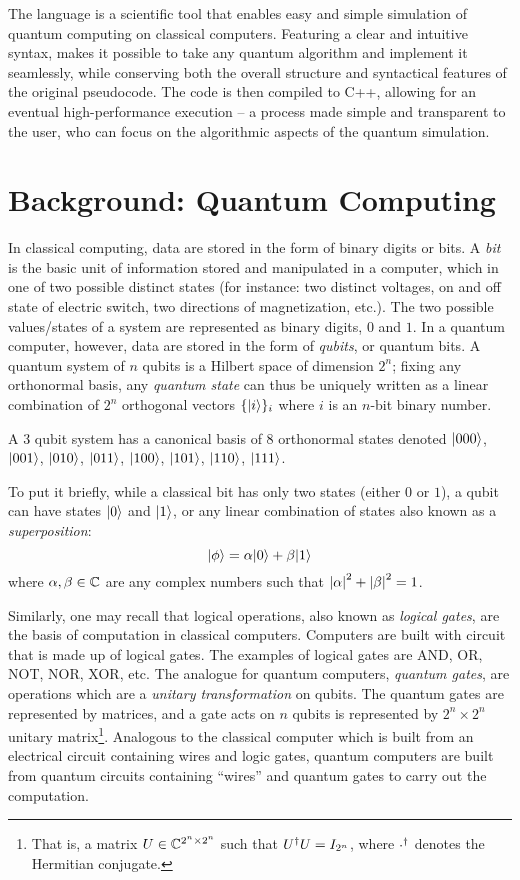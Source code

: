 The \QL language is a scientific tool that enables easy and simple simulation of quantum computing on classical computers. 
Featuring a clear and intuitive syntax, \QL makes it possible to take any quantum algorithm and implement it seamlessly, while 
conserving both the overall structure and syntactical features of the original pseudocode. The \QL code is then compiled to 
C++, allowing for an eventual high-performance execution -- a process made simple and transparent to the user, who can focus on
the algorithmic aspects of the quantum simulation.
\section{Background: Quantum Computing}

In classical computing, data are stored in the form of binary digits or bits. A \emph{bit} is the basic unit of information stored and manipulated in a computer, which in one of two possible distinct states (for instance: two distinct voltages, on and off state of electric switch, two directions of magnetization, etc.). 
The two possible values/states of a system are represented as binary digits, $0$ and $1$. In a quantum computer, however, data are stored in the form of \emph{qubits}, or quantum bits. A quantum system of $n$ qubits is a Hilbert space of dimension $2^n$; fixing any orthonormal basis, any \emph{quantum state} can thus be uniquely written as a linear combination of $2^n$ orthogonal vectors $\{|i\rangle\}_i$ where $i$ is an $n$-bit binary number.

\begin{example}A $3$ qubit system has a canonical basis of 8 orthonormal states denoted 
$|000\rangle$, $|001\rangle$, $|010\rangle$, $|011\rangle$, $|100\rangle$, $|101\rangle$, $|110\rangle$, $|111\rangle$.
\end{example}
To put it briefly, while a classical bit has only two states (either $0$ or $1$), a qubit can have  states $|0\rangle$ and $|1\rangle$, or any linear combination of states also known as a \emph{superposition}: %
\[
	|\phi\rangle=\alpha|0\rangle+\beta|1\rangle
\]
where $\alpha,\beta\in\mathbb{C}$ are any complex numbers such that $\left\lvert \alpha \right\rvert^2+\left\lvert \beta \right\rvert^2=1$.\medskip

Similarly, one may recall that logical operations, also known as \emph{logical gates}, are the basis of computation in classical computers. Computers are built with circuit that is made up of logical gates. The examples of logical gates are \textsf{AND}, \textsf{OR}, \textsf{NOT}, \textsf{NOR}, \textsf{XOR}, etc. The analogue for quantum computers, \emph{quantum gates}, are operations which are a \emph{unitary transformation} on qubits. The quantum gates are represented by matrices, and a gate acts on $n$ qubits is represented by $2^n \times 2^n$ unitary matrix\footnote{That is, a matrix $U\in\mathbb{C}^{2^n\times 2^n}$ such that ${U}^{\dagger}U=I_{2^n}$, where ${\cdot}^{\dagger}$ denotes the Hermitian conjugate.}. Analogous to the classical computer which is built from an electrical circuit containing wires and logic gates, quantum computers are built from  quantum circuits containing ``wires'' and quantum gates to carry out the computation.\medskip

